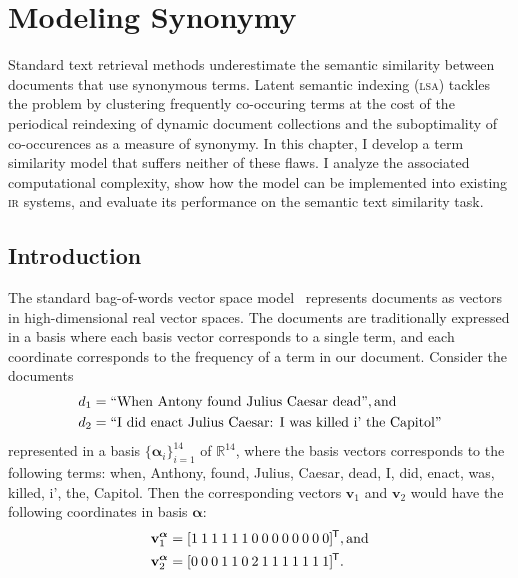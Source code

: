 \documentclass[
  digital, %
  notable, %
  lof,     %
  lot,     %
  nopalatino, color
]{fithesis3}
\def\abbr#1{\textsc{\MakeLowercase{#1}}}
\newcommand*{\tran}{^{\mkern-1.5mu\mathsf{T}}}
\begin{document}

\chapter{Modeling Synonymy}
\label{chap:synonymy}
Standard text retrieval methods underestimate the semantic similarity between
documents that use synonymous terms. Latent semantic indexing (\abbr{LSA}\index{LSA@\abbr{LSA}}) tackles the
problem by clustering frequently co-occuring terms at the cost of the periodical
reindexing of dynamic document collections and the suboptimality of
co-occurences as a measure of synonymy. In this
chapter, I develop a term similarity model that suffers neither of these
flaws. I analyze the associated computational complexity, show how the model
can be implemented into existing \abbr{IR}\index{ir@\abbr {IR}} systems, and
evaluate its performance on the semantic text similarity task.

\section{Introduction}
\label{sec:similarity-introduction}
The standard bag-of-words vector space model~\cite{ir:Salton1975}
represents documents as vectors in high-dimensional real vector spaces.
The documents are traditionally expressed in a basis where each basis vector
corresponds to a single term, and each coordinate corresponds to the frequency
of a term in our document. Consider the documents
\begin{align*}
  d_1 &=\text{``When Antony found Julius Caesar dead''}, \text{and}\index{.d1@$d_1$} \\
  d_2 &=\text{``I did enact Julius Caesar: I was killed i' the Capitol''}\index{.d2@$d_2$}
\end{align*}
represented in a basis $\{\bm\alpha_i\}_{i=1}^{14}$ of
$\mathbb R^{14}$, where the basis vectors corresponds
to the following terms: when, Anthony, found, Julius, Caesar, dead, I, did, enact, was,
killed, i', the, Capitol. Then the corresponding vectors $\mathbf v_1$ and
$\mathbf v_2$ would have the following coordinates in basis $\bm\alpha$:
\begin{align*}
  \mathbf v_1^{\bm\alpha} &= [1\:1\:1\:1\:1\:1\:0\:0\:0\:0\:0\:0\:0\:0]\tran, \text{and} \\
  \mathbf v_2^{\bm\alpha} &= [0\:0\:0\:1\:1\:0\:2\:1\:1\:1\:1\:1\:1\:1]\tran.
\end{align*}
\end{document}
